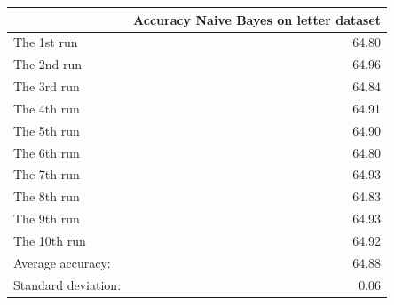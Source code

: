 \begin{tabular}{lr}
\toprule
{} &  Accuracy Naive Bayes on letter dataset \\
\midrule
The 1st run         &                                   64.80 \\
The 2nd run         &                                   64.96 \\
The 3rd run         &                                   64.84 \\
The 4th run         &                                   64.91 \\
The 5th run         &                                   64.90 \\
The 6th run         &                                   64.80 \\
The 7th run         &                                   64.93 \\
The 8th run         &                                   64.83 \\
The 9th run         &                                   64.93 \\
The 10th run        &                                   64.92 \\
Average accuracy:   &                                   64.88 \\
Standard deviation: &                                    0.06 \\
\bottomrule
\end{tabular}
